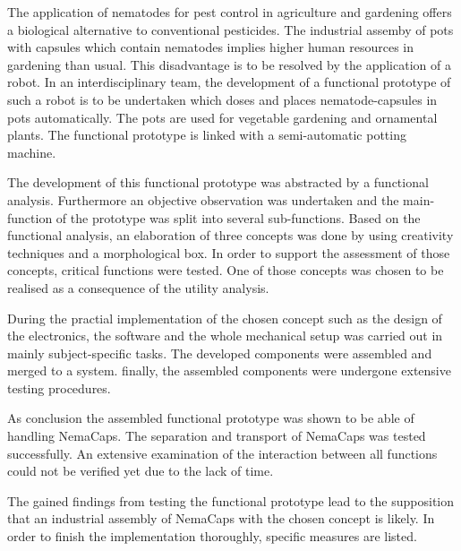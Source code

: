 \newpage
The application of nematodes for pest control in agriculture and gardening offers a biological alternative to conventional pesticides. The industrial assemby of pots with capsules which contain nematodes implies higher human resources in gardening than usual. This disadvantage is to be resolved by the application of a robot. In an interdisciplinary team, the development of a functional prototype of such a robot is to be undertaken which doses and places nematode-capsules in pots automatically. The pots are used for vegetable gardening and ornamental plants. The functional prototype is linked with a semi-automatic potting machine.
\newline

The development of this functional prototype was abstracted by a functional analysis. Furthermore an objective observation was undertaken and the main-function of the prototype was split into several sub-functions. Based on the functional analysis, an elaboration of three concepts was done by using creativity techniques and a morphological box. In order to support the assessment of those concepts, critical functions were tested. One of those concepts was chosen to be realised as a consequence of the utility analysis.
\newline

During the practial implementation of the chosen concept such as the design of the electronics, the software and the whole mechanical setup was carried out in mainly subject-specific tasks. The developed components were assembled and merged to a system. finally, the assembled components were undergone extensive testing procedures.
\newline

As conclusion the assembled functional prototype was shown to be able of handling NemaCaps. The separation and transport of NemaCaps was tested successfully. An extensive examination of the  interaction between all functions could not be verified yet due to the lack of time.
\newline

The gained findings from testing the functional prototype lead to the supposition that an industrial assembly of NemaCaps with the chosen concept is likely. In order to finish the implementation thoroughly, specific measures are listed.